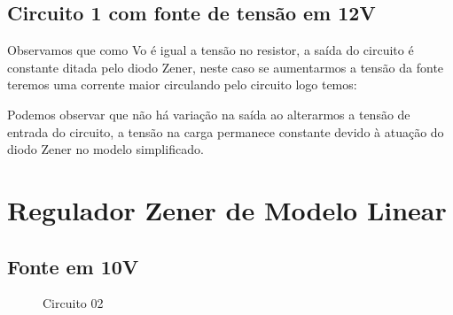 \subsection{Circuito 1 com fonte de tensão em 12V}

Observamos que como Vo é igual a tensão no resistor, a saída do circuito é constante ditada pelo diodo Zener, neste caso se aumentarmos a tensão da fonte teremos uma corrente maior circulando pelo circuito logo temos:

\begin{Resolucao}[H]
    \label{res:circuito02}
\end{Resolucao}

Podemos observar que não há variação na saída ao alterarmos a tensão de entrada do circuito, a tensão na carga permanece constante devido à atuação do diodo Zener no modelo simplificado.

\section{Regulador Zener de Modelo Linear}

\subsection{Fonte em 10V}

\begin{figure}[H]
    \centering
    \caption{Circuito 02}
    \vspace{-0.3cm}
    \label{fig:Circuito02}
\end{figure}

